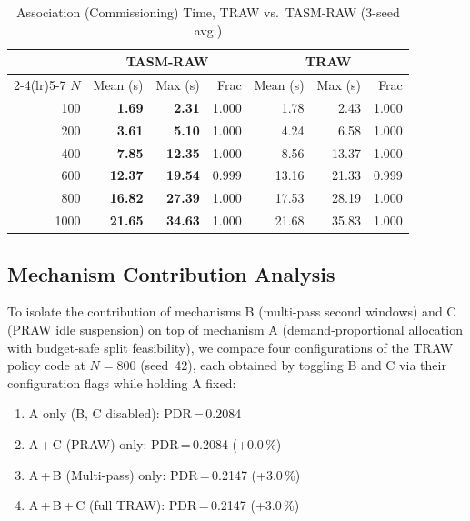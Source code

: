 \documentclass[journal]{IEEEtran}
\begin{document}
\begin{table}[!t]
\renewcommand{\arraystretch}{1.15}
\caption{Association (Commissioning) Time, TRAW vs.\ TASM-RAW
(3-seed avg.)}
\label{tab:assoc}
\centering
\setlength{\tabcolsep}{4pt}
\begin{tabular}{@{}rrrrrrr@{}}
\toprule
& \multicolumn{3}{c}{TASM-RAW} & \multicolumn{3}{c}{TRAW} \\
\cmidrule(lr){2-4}\cmidrule(lr){5-7}
$N$ & Mean (s) & Max (s) & Frac & Mean (s) & Max (s) & Frac \\
\midrule
 100 &  \textbf{1.69} &  \textbf{2.31} & 1.000 &  1.78 &  2.43 & 1.000 \\
 200 &  \textbf{3.61} &  \textbf{5.10} & 1.000 &  4.24 &  6.58 & 1.000 \\
 400 &  \textbf{7.85} & \textbf{12.35} & 1.000 &  8.56 & 13.37 & 1.000 \\
 600 & \textbf{12.37} & \textbf{19.54} & 0.999 & 13.16 & 21.33 & 0.999 \\
 800 & \textbf{16.82} & \textbf{27.39} & 1.000 & 17.53 & 28.19 & 1.000 \\
1000 & \textbf{21.65} & \textbf{34.63} & 1.000 & 21.68 & 35.83 & 1.000 \\
\bottomrule
\end{tabular}
\end{table}

\subsection{Mechanism Contribution Analysis}
\label{sec:contrib}

To isolate the contribution of mechanisms B (multi-pass second windows)
and C (PRAW idle suspension) on top of mechanism A (demand-proportional
allocation with budget-safe split feasibility), we compare four
configurations of the TRAW policy code at $N\!=\!800$ (seed~42), each
obtained by toggling B and C via their configuration flags while
holding A fixed:

\begin{enumerate}
  \item A only (B, C disabled): PDR\,=\,0.2084
  \item A\,+\,C (PRAW) only: PDR\,=\,0.2084 (+0.0\,\%)
  \item A\,+\,B (Multi-pass) only: PDR\,=\,0.2147 (+3.0\,\%)
  \item A\,+\,B\,+\,C (full TRAW): PDR\,=\,0.2147 (+3.0\,\%)
\end{enumerate}
\end{document}
